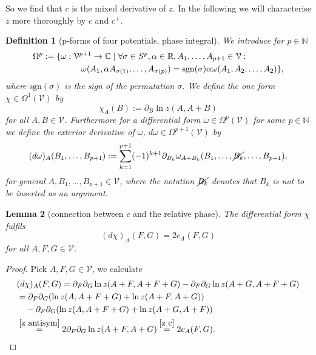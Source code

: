 \documentclass[b5paper,draft,openbib,12pt]{memoir}
\newtheorem{Def}{Definition}
\newtheorem{Lemma}[Def]{Lemma}
\begin{document}
So we find that \(c\) is the mixed derivative of \(z\). In the following we will characterise \(z\) more thoroughly by \(c\) and \(c^+\).
\begin{Def}[p-forms of four potentials, phase integral]
We introduce for \(p\in\mathbb{N}\)
\begin{align}\notag
&\Omega^p:=\{\omega :\mathcal{V}^{p+1}\rightarrow \mathbb{C}\mid \forall \sigma \in S^p, \alpha\in\mathbb{R}, A_1,\dots, A_{p+1}\in\mathcal{V}: \\
&\hspace{2cm}\omega(A_1,\alpha A_{\sigma(1)},\dots, A_{\sigma(p)})=\mathrm{sgn}(\sigma) \alpha \omega(A_1,A_2,\dots, A_2)\},
\end{align}
where \(\mathrm{sgn}(\sigma)\) is the sign of the permutation \(\sigma\).
We define the one form \(\chi\in \Omega^1(\mathcal{V})\) by
\begin{equation}\label{de chi}
\chi_A(B):=\partial_B\ln z(A,A+B)
\end{equation}
for all \(A,B\in\mathcal{V}\).
Furthermore for a differential form \(\omega\in \Omega^p(\mathcal{V})\) for some \(p\in\mathbb{N}\) we define the exterior derivative of 
\(\omega\), \(d \omega\in\Omega^{p+1}(\mathcal{V})\) by
\begin{equation}
(d\omega)_A(B_1,\dots, B_{p+1}):=\sum_{k=1}^{p+1} (-1)^{k+1} \partial_{B_k}\omega_{A+B_k}(B_1,\dots , \cancel{B_k},\dots, B_{p+1}),
\end{equation}
for general \(A,B_1,\dots, B_{p+1}\in\mathcal{V}\), where the notation \(\cancel{B_k}\) denotes that \(B_k\) is not to be inserted as an argument.

\end{Def}

\begin{Lemma}[connection between \(c\) and the relative phase]\label{connection between c and the relative phase}
The differential form \(\chi\) fulfils 
\begin{equation}
(d\chi)_A(F,G)=2 c_A(F,G)
\end{equation}
for all \(A,F,G\in\mathcal{V}\).
\end{Lemma}
\begin{proof}
Pick \(A,F,G\in \mathcal{V}\), we calculate
\begin{align}
&(d\chi)_A(F,G)=\partial_F\partial_G \ln z(A+F,A+F+G)-\partial_F \partial_G \ln z(A+G,A+F+G)\\
&=\partial_F\partial_G (\ln  z(A,A+F+G)+\ln z(A+F,A+G))\\
 &\quad - \partial_F\partial_G(  \ln z(A,A+F+G)+\ln z(A+G,A+F))\\
&\overset{\eqref{z antisym}}{=} 2 \partial_F\partial_G \ln z(A+F,A+G)\overset{\eqref{z c}}{=}2 c_A(F,G).
\end{align}
\end{proof}
\end{document}
